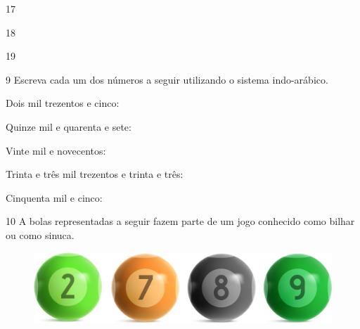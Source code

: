 \begin{escolha}
\item
  17

\begin{mdframed}[linewidth=2pt,linecolor=salmao,roundcorner=2pt]
\vspace{.5cm}
\end{mdframed}

\pagebreak
\item
  18

\begin{mdframed}[linewidth=2pt,linecolor=salmao,roundcorner=2pt]
\vspace{1cm}
\end{mdframed}

\item
  19

\begin{mdframed}[linewidth=2pt,linecolor=salmao,roundcorner=2pt]
\vspace{1cm}
\end{mdframed}

\end{escolha}

\num{9} Escreva cada um dos números a seguir utilizando o sistema indo-arábico.

\begin{escolha}
\item
  Dois mil trezentos e cinco: \reduline{2.305\hfill}
\item
  Quinze mil e quarenta e sete: \reduline{15.047\hfill}
\item
  Vinte mil e novecentos: \reduline{20.900\hfill}
\item
  Trinta e três mil trezentos e trinta e três: \reduline{33.333\hfill}
\item
  Cinquenta mil e cinco: \reduline{50.005\hfill}
\end{escolha}

\pagebreak
\num{10} A bolas representadas a seguir fazem parte de um jogo conhecido como
bilhar ou como sinuca.

\begin{figure}[htpb!]
\centering
\includegraphics[width=\textwidth]{media/image7.png}
\end{figure}


